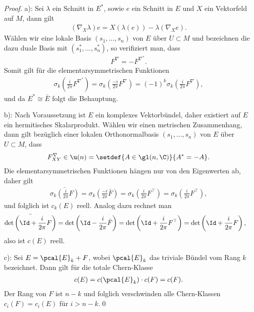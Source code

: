 \documentclass[%
	paper=a5,%
	fleqn,%
	DIV=18,%
	BCOR=0mm,
	fontsize=11pt,
	titlepage=false,%
	bibliography=totoc,
	DIV=18,%
	twoside=true,
	pdftitle=Riemannsche Geometrie,
	pdfauthor=Uwe Semmelmann,
	numbers=noendperiod]%
	{scrbook}
\begin{document}
\begin{proof}
a): Sei $\lambda$ ein Schnitt in $E^*$, sowie $e$ ein Schnitt in $E$ und $X$ ein Vektorfeld auf $M$, dann gilt
\begin{align*}
(\nabla_{X}\lambda)e = X(\lambda( e)) - \lambda(\nabla_{X}e).
\end{align*}
Wählen wir eine lokale Basis $(s_{1},\ldots,s_{n})$ von $E$ über $U\subset M$ und bezeichnen die dazu duale Basis mit $(s_{1}^*,\ldots,s_{n}^*)$, so verifiziert man, dass
\begin{align*}
F^\nabla = -F^{\nabla^*}.
\end{align*}
Somit gilt für die elementarsymmetrischen Funktionen
\begin{align*}
\sigma_{k}\left(\frac{i}{2\pi}F^{\nabla^*}\right)
= 
\sigma_{k}\left(\frac{-i}{2\pi}F^{\nabla}\right)
= (-1)^k
\sigma_{k}\left(\frac{i}{2\pi}F^{\nabla}\right),
\end{align*}
und da $E^*\cong \bar{E}$ folgt die Behauptung.

b): Nach Voraussetzung ist $E$ ein komplexes Vektorbündel, daher existiert auf $E$ ein hermitisches Skalarprodukt. Wählen wir einen metrischen Zusammenhang, dann gilt bezüglich einer lokalen Orthonormalbasis $(s_{1},\ldots,s_{n})$ von $E$ über $U\subset M$, dass
\begin{align*}
F_{XY}^\nabla \in \u(n) = \setdef{A\in\gl(n,\C)}{A^* = -A}.
\end{align*}
Die elementarsymmetrischen Funktionen hängen nur von den Eigenwerten ab, daher gilt
\begin{align*}
\bar{\sigma_{k}\left(\frac{i}{2\pi}F\right)} = 
\sigma_{k}\left(\frac{-i}{2\pi}\bar{F}\right)
= 
\sigma_{k}\left(\frac{i}{2\pi}F^\top\right) = 
\sigma_{k}\left(\frac{i}{2\pi}F^\top\right),
\end{align*}
und folglich ist $c_{k}(E)$ reell. Analog dazu rechnet man
\begin{align*}
\bar{\det\left(\Id + \frac{i}{2\pi}F\right)}
&= 
\det\left(\Id - \frac{i}{2\pi}\bar{F}\right)
=
\det\left(\Id + \frac{i}{2\pi}F^\top\right)
= 
\det\left(\Id + \frac{i}{2\pi}F\right),
\end{align*}
also ist $c(E)$ reell.

c): Sei $E= \pcal{E}_{k}+F$, wobei $\pcal{E}_k$ das triviale Bündel vom Rang $k$ bezeichnet. Dann gilt für die totale Chern-Klasse
\begin{align*}
c(E) = c(\pcal{E}_{k})\cdot c(F) = c(F).
\end{align*}
Der Rang von $F$ ist $n-k$ und folglich verschwinden alle Chern-Klassen $c_{i}(F)=c_{i}(E)$ für $i>n-k$.\qed
\end{proof}
\end{document}
